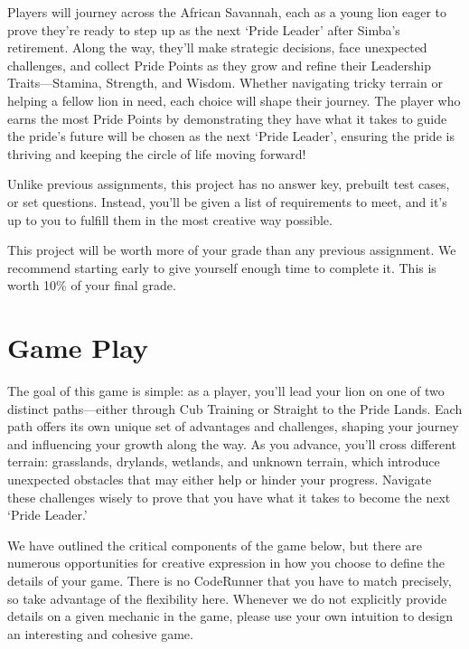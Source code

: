 Players will journey across the African Savannah, each as a young lion eager to prove they're ready to step up as the next `Pride Leader' after Simba's retirement. Along the way, they'll make strategic decisions, face unexpected challenges, and collect Pride Points as they grow and refine their Leadership Traits—Stamina, Strength, and Wisdom. Whether navigating tricky terrain or helping a fellow lion in need, each choice will shape their journey. The player who earns the most Pride Points by demonstrating they have what it takes to guide the pride's future will be chosen as the next `Pride Leader', ensuring the pride is thriving and keeping the circle of life moving forward! 

Unlike previous assignments, this project has no answer key, prebuilt test cases, or set questions. Instead, you'll be given a list of requirements to meet, and it's up to you to fulfill them in the most creative way possible. 

This project will be worth more of your grade than any previous assignment. We recommend starting early to give yourself enough time to complete it. This is worth 10\% of your final grade. 

\section{\textbf{Game Play}}

The goal of this game is simple: as a player, you'll lead your lion on one of two distinct paths—either through Cub Training or Straight to the Pride Lands. Each path offers its own unique set of advantages and challenges, shaping your journey and influencing your growth along the way. As you advance, you'll cross different terrain: grasslands, drylands, wetlands, and unknown terrain, which introduce unexpected obstacles that may either help or hinder your progress. Navigate these challenges wisely to prove that you have what it takes to become the next `Pride Leader.' 

We have outlined the critical components of the game below, but there are numerous opportunities for creative expression in how you choose to define the details of your game. There is no CodeRunner that you have to match precisely, so take advantage of the flexibility here. Whenever we do not explicitly provide details on a given mechanic in the game, please use your own intuition to design an interesting and cohesive game.


